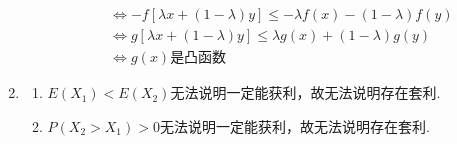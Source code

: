 \begin{enumerate}[label=\arabic{section}.\arabic*]
\begin{enumerate}[label=\alph*)]
\begin{align*}
            &\iff -f[\lambda x+(1-\lambda)y] \leq -\lambda f(x)-(1-\lambda)f(y)\\
            & \iff g[\lambda x+(1-\lambda)y] \leq \lambda g(x)+(1-\lambda)g(y)\\
            &\iff g(x)\text{是凸函数}
        \end{align*}
    \end{enumerate}
    \item \sol
    \begin{enumerate}[label=\alph*)]
        \item $E(X_1) < E(X_2)$无法说明一定能获利，故无法说明存在套利.
        \item $P(X_2>X_1)>0$无法说明一定能获利，故无法说明存在套利.
    \end{enumerate}
\end{enumerate}
\clearpage